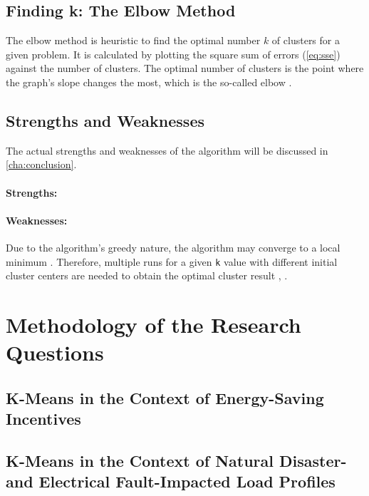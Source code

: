 \subsection{Finding k: The Elbow Method}
The elbow method is heuristic to find the optimal number $k$ of clusters for a given problem.
It is calculated by plotting the square sum of errors (\autoref*{eq:sse}) against the number of clusters.
The optimal number of clusters is the point where the graph's slope changes the most, which is the so-called elbow \cite{SYA-IKC}.

\subsection{Strengths and Weaknesses}
The actual strengths and weaknesses of the algorithm will be discussed in \autoref*{cha:conclusion}.

\paragraph*{Strengths:}

\paragraph*{Weaknesses:}
Due to the algorithm's greedy nature, the algorithm may converge to a local minimum \cite{JAI-DCB}.
Therefore, multiple runs for a given \texttt{k} value with different initial cluster centers are needed to obtain the optimal cluster result \cite{EZU-CPF}, \cite{BAR-LVG}.

\section{Methodology of the Research Questions}
\subsection{K-Means in the Context of Energy-Saving Incentives}

\subsection{K-Means in the Context of Natural Disaster- and Electrical Fault-Impacted Load Profiles}
